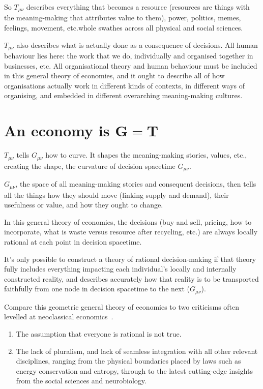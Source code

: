 So $T_{\mu\nu}$ describes everything that becomes a resource (resources are things with the meaning\hyp{}making that attributes value to them), power, politics, memes, feelings, movement, etc.\textemdash whole swathes across all physical and social sciences.


$T_{\mu\nu}$ also describes what is actually done as a consequence of decisions. All human behaviour lies here: the work that we do, individually and organised together in businesses, etc. All organisational theory and human behaviour must be included in this general theory of economies, and it ought to describe all of how organisations  actually work in different kinds of contexts, in different ways of organising, and embedded in different overarching meaning\hyp{}making cultures.
\section*{An economy is $\mathbf{G} = \mathbf{T}$}
$T_{\mu\nu}$ tells $G_{\mu\nu}$ how to curve. It shapes the meaning\hyp{}making stories, values, etc., creating the shape, the curvature of decision spacetime $G_{\mu\nu}$.


$G_{\mu\nu}$, the space of all meaning\hyp{}making stories and consequent decisions, then tells all the things how they should move (linking supply and demand), their usefulness or value, and how they ought to change.


In this general theory of economies, the decisions (buy and sell, pricing, how to incorporate, what is waste versus resource after recycling, etc.) are always locally rational at each point in decision spacetime. 


It's only possible to construct a theory of rational decision\hyp{}making if that theory fully includes everything impacting each individual's locally and internally constructed reality, and describes accurately how that reality is to be transported faithfully from one node in decision spacetime to the next ($G_{\mu\nu}$).


Compare this geometric general theory of economies to two criticisms often levelled at neoclassical economics~\cite{keen-debunking, earl-econocracy}. 


\begin{enumerate}
\item The assumption that everyone is rational is not true.
\item The lack of pluralism, and lack of seamless integration with all other relevant disciplines, ranging from the physical boundaries placed by laws such as energy conservation and entropy, through to the latest cutting\hyp{}edge insights from the social sciences and neurobiology. 
\end{enumerate}


